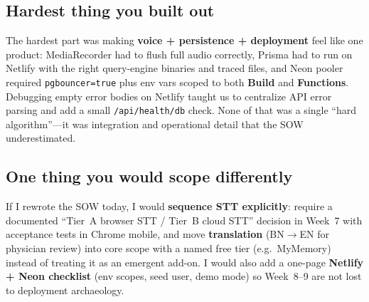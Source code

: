 \documentclass[11pt]{article}
\begin{document}
\subsection*{Hardest thing you built out}

The hardest part was making \textbf{voice + persistence + deployment} feel like one product: MediaRecorder had to flush full audio correctly, Prisma had to run on Netlify with the right query-engine binaries and traced files, and Neon pooler required \texttt{pgbouncer=true} plus env vars scoped to both \textbf{Build} and \textbf{Functions}. Debugging empty error bodies on Netlify taught us to centralize API error parsing and add a small \texttt{/api/health/db} check. None of that was a single ``hard algorithm''---it was integration and operational detail that the SOW underestimated.

\subsection*{One thing you would scope differently}

If I rewrote the SOW today, I would \textbf{sequence STT explicitly}: require a documented ``Tier~A browser STT / Tier~B cloud STT'' decision in Week~7 with acceptance tests in Chrome mobile, and move \textbf{translation} (BN$\rightarrow$EN for physician review) into core scope with a named free tier (e.g.\ MyMemory) instead of treating it as an emergent add-on. I would also add a one-page \textbf{Netlify + Neon checklist} (env scopes, seed user, demo mode) so Week~8--9 are not lost to deployment archaeology.
\end{document}
